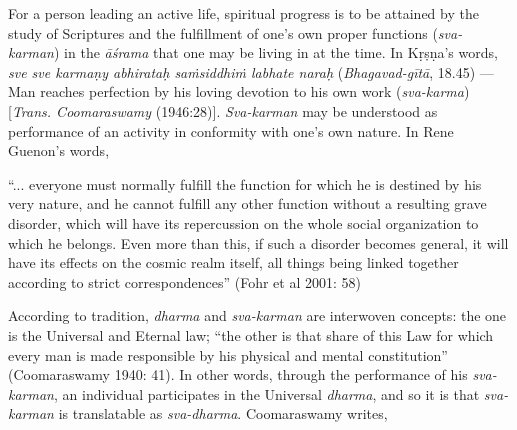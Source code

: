 For a person leading an active life, spiritual progress is to be attained by the study of Scriptures and the fulfillment of one’s own proper functions ({\sl sva-karman}) in the {\sl āśrama} that one may be living in at the time. In Kṛṣṇa’s words, {\sl sve sve karmaṇy abhirataḥ saṁsiddhiṁ labhate naraḥ} ({\sl Bhagavad-gītā}, 18.45) — Man reaches perfection by his loving devotion to his own work ({\sl sva-karma}) [{\sl Trans. Coomaraswamy} (1946:28)]. {\sl Sva-karman} may be understood as performance of an activity in conformity with one’s own nature. In Rene Guenon’s words, 

\begin{myquote}
“... everyone must normally fulfill the function for which he is destined by his very nature, and he cannot fulfill any other function without a resulting grave disorder, which will have its repercussion on the whole social organization to which he belongs. Even more than this, if such a disorder becomes general, it will have its effects on the cosmic realm itself, all things being linked together according to strict correspondences”
\hfill (Fohr et al 2001: 58)  
\end{myquote}

According to tradition, {\sl dharma} and {\sl sva-karman} are interwoven concepts: the one is the Universal and Eternal law; “the other is that share of this Law for which every man is made responsible by his physical and mental constitution” (Coomaraswamy 1940: 41). In other words, through the performance of his {\sl sva-karman}, an individual participates in the Universal {\sl dharma}, and so it is that {\sl sva-karman} is translatable as {\sl sva-dharma}. Coomaraswamy writes, 

